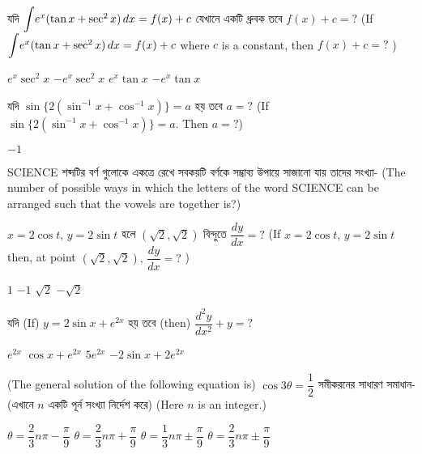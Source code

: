 \documentclass[addpoints]{exam}
\begin{document}
\begin{questions}
\question যদি $ \mathlarger{\int}e^{x}(\tan x + \sec^{2}x)\, dx =f(x) + c $  যেখানে একটি ধ্রুবক তবে $ f(x)+c = ?$ (If $ \mathlarger{\int}e^{x}(\tan x + \sec^{2}x)\, dx =f(x) + c $ where $ c $ is a constant, then $ f(x)+c =? $ )


\begin{oneparchoices}
\choice  $ e^{x}\sec^{2}x $
\choice  $ -e^{x}\sec^{2}x $
\choice  $ e^{x}\tan x $
\choice  $ -e^{x}\tan x $
\end{oneparchoices}


\question যদি $ \sin\{2(\sin^{-1}x+ \cos^{-1}x)\} =a $ হয় তবে $ a=? $ (If $ \sin\{2(\sin^{-1}x+ \cos^{-1}x)\} =a $. Then $ a =? $)


\begin{oneparchoices}
\choice  $ -1 $
\end{oneparchoices}

 \question SCIENCE শব্দটির বর্ণ গুলোকে একত্রে রেখে সবকয়টি বর্ণকে সম্ভ্রাব্য উপায়ে সাজানো যায় তাদের সংখ্যা- (The number of possible ways in which the letters of the word SCIENCE can be arranged such that the vowels are together is?)

\begin{oneparchoices}
\end{oneparchoices}

\question $ x=2\cos t,\, y= 2\sin t $  হলে $ (\sqrt{2},\sqrt{2}) $ বিন্দুতে $ \dfrac{dy}{dx} = ? $ (If $ x=2\cos t,\, y= 2\sin t $ then, at point $ (\sqrt{2},\sqrt{2}),\, \dfrac{dy}{dx} =? $   )

\begin{oneparchoices}
\choice $ 1 $
\choice $ -1 $
\choice $ \sqrt{2} $
\choice $ -\sqrt{2} $
\end{oneparchoices}

\question  যদি (If) $ y= 2\sin x + e^{2x} $ হয় তবে (then) $ \dfrac{d^{2}y}{dx^{2}}+ y=? $ 

\begin{oneparchoices}
\choice  $ e^{2x} $
\choice  $ \cos x + e^{2x} $ 
\choice  $ 5e^{2x} $
\choice  $ -2\sin x + 2e^{2x} $ 
\end{oneparchoices}

\question (The general solution of the following equation is) $ \cos3\theta = \dfrac{1}{2} $ সমীকরনের সাধারণ সমাধান- (এখানে $ n $ একটি পূর্ন সংখ্যা নির্দেশ করে) (Here $ n $ is an integer.)

\begin{oneparchoices}
\choice $ \theta = \dfrac{2}{3} n\pi -\dfrac{\pi}{9} $
\choice $ \theta = \dfrac{2}{3} n\pi +\dfrac{\pi}{9} $
\choice $ \theta = \dfrac{1}{3}n\pi \pm \dfrac{\pi}{9} $
\choice $ \theta = \dfrac{2}{3}n\pi \pm \dfrac{\pi}{9} $
\end{oneparchoices}



\end{questions}
\end{document}
